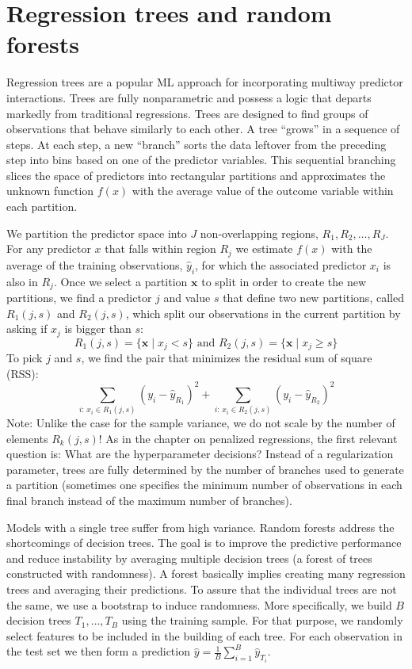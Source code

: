 \documentclass[
]{krantz}
\begin{document}
\hypertarget{regression-trees-and-random-forests}{%
\section{Regression trees and random forests}\label{regression-trees-and-random-forests}}

Regression trees are a popular ML approach for incorporating multiway predictor interactions. Trees are fully nonparametric and possess a logic that departs markedly from traditional regressions. Trees are designed to find groups of observations that behave similarly to each other. A tree ``grows'' in a sequence of steps. At each step, a new ``branch'' sorts the data leftover from the preceding step into bins based on one of the predictor variables. This sequential branching slices the space of predictors into rectangular partitions and approximates the unknown function \(f(x)\) with the average value of the outcome variable within each partition.

We partition the predictor space into \(J\) non-overlapping regions, \(R_1, R_2, \ldots, R_J\). For any predictor \(x\) that falls within region \(R_j\) we estimate \(f(x)\) with the average of the training observations, \(\hat y_i\), for which the associated predictor \(x_i\) is also in \(R_j\). Once we select a partition \(\mathbf{x}\) to split in order to create the new partitions, we find a predictor \(j\) and value \(s\) that define two new partitions, called \(R_1(j,s)\) and \(R_2(j,s)\), which split our observations in the current partition by asking if \(x_j\) is bigger than \(s\):
\[
R_1(j,s) = \{\mathbf{x} \mid x_j < s\} \mbox{  and  } R_2(j,s) = \{\mathbf{x} \mid x_j \geq s\}
\]
To pick \(j\) and \(s\), we find the pair that minimizes the residual sum of square (RSS):
\[
\sum_{i:\, x_i \in R_1(j,s)} (y_i - \hat{y}_{R_1})^2 +
\sum_{i:\, x_i \in R_2(j,s)} (y_i - \hat{y}_{R_2})^2
\]
Note: Unlike the case for the sample variance, we do not scale by the number of elements \(R_k(j, s)\)! As in the chapter on penalized regressions, the first relevant question is: What are the hyperparameter decisions? Instead of a regularization parameter, trees are fully determined by the number of branches used to generate a partition (sometimes one specifies the minimum number of observations in each final branch instead of the maximum number of branches).

Models with a single tree suffer from high variance. Random forests address the shortcomings of decision trees. The goal is to improve the predictive performance and reduce instability by averaging multiple decision trees (a forest of trees constructed with randomness). A forest basically implies creating many regression trees and averaging their predictions. To assure that the individual trees are not the same, we use a bootstrap to induce randomness. More specifically, we build \(B\) decision trees \(T_1, \ldots, T_B\) using the training sample. For that purpose, we randomly select features to be included in the building of each tree. For each observation in the test set we then form a prediction \(\hat{y} = \frac{1}{B}\sum\limits_{i=1}^B\hat{y}_{T_i}\).
\end{document}
